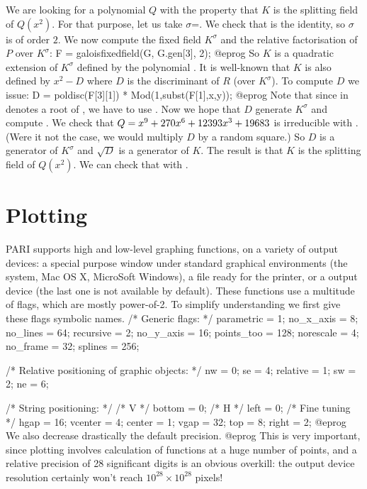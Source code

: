 We are looking for a polynomial $Q$ with the property that $K$ is the splitting
field of $Q(x^2)$. For that purpose, let us take $\sigma$=.  We
check that  is the identity, so $\sigma$ is of order $2$. We now compute the fixed field $K^\sigma$ and the relative factorisation of $P$ over
$K^\sigma$: 
\bprog 
F = galoisfixedfield(G, G.gen[3], 2); 
@eprog\noindent
So $K$ is a quadratic extension of $K^\sigma$ defined by the polynomial
. It is well-known that $K$ is also defined by $x^2-D$
where $D$ is the discriminant of $R$ (over $K^\sigma$).
To compute $D$ we issue:
\bprog
D = poldisc(F[3][1]) * Mod(1,subst(F[1],x,y));
@eprog\noindent
Note that since  in  denotes a root of , we 
have to use .  Now we hope that $D$ generate $K^\sigma$ and
compute . We check that $Q=x^9+270\*x^6+12393\*x^3+19683$ is
irreducible with . (Were it not the case, we would
multiply $D$ by a random square.) So $D$ is a generator of $K^\sigma$ and
$\sqrt{D}$ is a generator of $K$. The result is that $K$ is the splitting
field of $Q(x^2)$.  We can check that with
.

\section{Plotting}

PARI supports high and low-level graphing functions, on a variety of output
devices: a special purpose window under standard graphical environments (the
 system, Mac OS X, MicroSoft Windows), a  file
ready for the printer, or a  output device (the last one
is not available by default). These functions use a multitude of flags, which
are mostly power-of-2. To simplify understanding we first give these flags
symbolic names.
\bprog
  /* Generic flags: */
  parametric = 1;  no_x_axis =  8;  no_lines   = 64;
  recursive  = 2;  no_y_axis = 16;  points_too = 128;
  norescale  = 4;  no_frame  = 32;  splines    = 256;

  /* Relative positioning of graphic objects: */
  nw       = 0;  se       = 4;  relative = 1;
  sw       = 2;  ne       = 6;

  /* String positioning: */
  /* V */ bottom  =  0;   /* H */  left   = 0;   /* Fine tuning */ hgap = 16;
          vcenter =  4;            center = 1;                     vgap = 32;
          top     =  8;            right  = 2;
@eprog\noindent
We also decrease drastically the default precision.
\bprog
@eprog\noindent
This is very important, since plotting involves calculation of functions at
a huge number of points, and a relative precision of 28 significant digits
is an obvious overkill: the output device resolution certainly won't reach
$10^{28} \times 10^{28}$ pixels!

